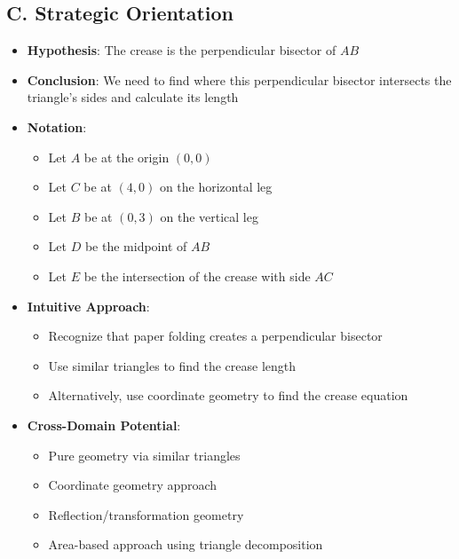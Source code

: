 \documentclass[12pt]{article}
\begin{document}
\begin{problemconfigbox}
\subsection*{C. Strategic Orientation}
\begin{itemize}[leftmargin=*]
    \item \textbf{Hypothesis}: The crease is the perpendicular bisector of $AB$
    \item \textbf{Conclusion}: We need to find where this perpendicular bisector intersects the triangle's sides and calculate its length
    \item \textbf{Notation}: 
    \begin{itemize}
        \item Let $A$ be at the origin $(0,0)$
        \item Let $C$ be at $(4,0)$ on the horizontal leg
        \item Let $B$ be at $(0,3)$ on the vertical leg
        \item Let $D$ be the midpoint of $AB$
        \item Let $E$ be the intersection of the crease with side $AC$
    \end{itemize}
    \item \textbf{Intuitive Approach}: 
    \begin{itemize}
        \item Recognize that paper folding creates a perpendicular bisector
        \item Use similar triangles to find the crease length
        \item Alternatively, use coordinate geometry to find the crease equation
    \end{itemize}
    \item \textbf{Cross-Domain Potential}: 
    \begin{itemize}
        \item Pure geometry via similar triangles
        \item Coordinate geometry approach
        \item Reflection/transformation geometry
        \item Area-based approach using triangle decomposition
    \end{itemize}
\end{itemize}
\end{problemconfigbox}
\end{document}
